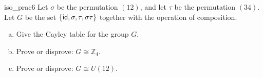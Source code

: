 \begin{exercise}{iso_prac6}
Let $\sigma$ be the permutation $(12)$, and let $\tau$ be the permutation $(34)$.
Let $G$ be the set $\{ \sf{id}, \sigma, \tau, \sigma\tau \}$ together with the operation of composition.
\begin{enumerate}[(a)]
\item
Give the Cayley table for the group $G$.
\item
Prove or disprove: $G \cong {\mathbb Z}_4$.
\item
Prove or disprove: $G \cong U(12)$.
\end{enumerate}
\end{exercise}




